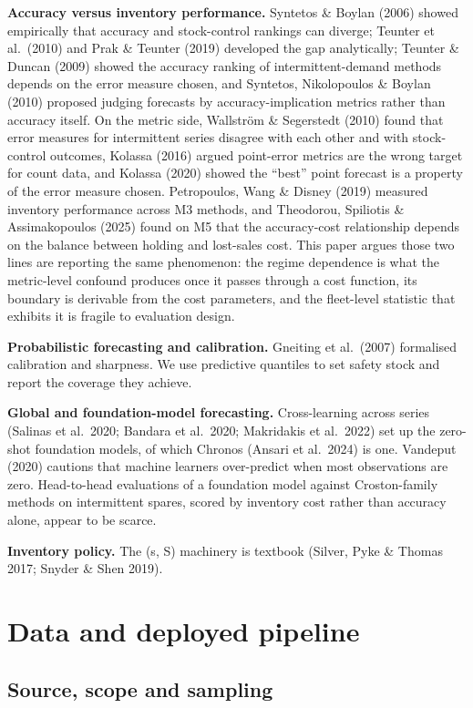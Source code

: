 \documentclass[11pt]{article}
\begin{document}
\textbf{Accuracy versus inventory performance.} Syntetos \& Boylan (2006)
showed empirically that accuracy and stock-control rankings can diverge;
Teunter et al.\ (2010) and Prak \& Teunter (2019) developed the gap
analytically; Teunter \& Duncan (2009) showed the accuracy ranking of
intermittent-demand methods depends on the error measure chosen, and Syntetos,
Nikolopoulos \& Boylan (2010) proposed judging forecasts by
accuracy-implication metrics rather than accuracy itself. On the metric side, Wallstr\"om \& Segerstedt (2010) found that
error measures for intermittent series disagree with each other and with
stock-control outcomes, Kolassa (2016) argued point-error metrics are the
wrong target for count data, and Kolassa (2020) showed the ``best'' point
forecast is a property of the error measure chosen. Petropoulos, Wang \&
Disney (2019) measured inventory performance across M3 methods, and Theodorou,
Spiliotis \& Assimakopoulos (2025) found on M5 that the accuracy-cost
relationship depends on the balance between holding and lost-sales cost. This
paper argues those two lines are reporting the same phenomenon: the regime
dependence is what the metric-level confound produces once it passes through a
cost function, its boundary is derivable from the cost parameters, and the
fleet-level statistic that exhibits it is fragile to evaluation design.

\textbf{Probabilistic forecasting and calibration.} Gneiting et al.\ (2007)
formalised calibration and sharpness. We use predictive quantiles to set safety
stock and report the coverage they achieve.

\textbf{Global and foundation-model forecasting.} Cross-learning across series
(Salinas et al.\ 2020; Bandara et al.\ 2020; Makridakis et al.\ 2022) set up
the zero-shot foundation models, of which Chronos (Ansari et al.\ 2024) is one.
Vandeput (2020) cautions that machine learners over-predict when most
observations are zero. Head-to-head evaluations of a foundation model against
Croston-family methods on intermittent spares, scored by inventory cost rather
than accuracy alone, appear to be scarce.

\textbf{Inventory policy.} The (s, S) machinery is textbook (Silver, Pyke \&
Thomas 2017; Snyder \& Shen 2019).

\section{Data and deployed pipeline}

\subsection{Source, scope and sampling}
\end{document}
